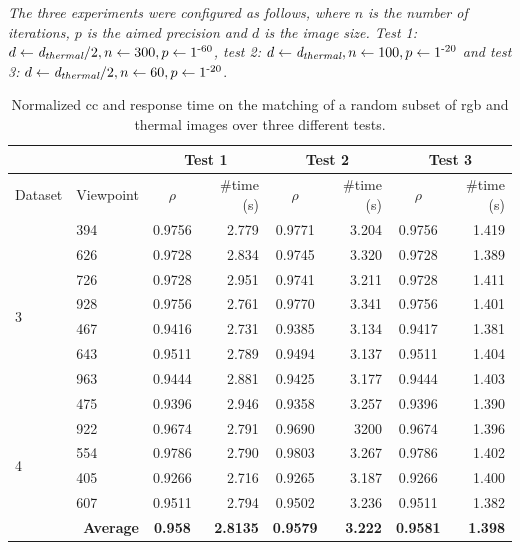 \textit{The three experiments were configured as follows, where $n$ is the number of iterations, $p$ is the aimed precision and $d$ is the image size. Test 1: $d \gets \textit{d}_{\textit{thermal}} / 2, n \gets 300, p \gets 1\textsuperscript{-60}$, test 2: $d \gets \textit{d}_{\textit{thermal}}, n \gets 100, p \gets 1\textsuperscript{-20}$ and test 3: $d \gets \textit{d}_{\textit{thermal}} / 2, n \gets 60, p \gets 1\textsuperscript{-20}$}.

\renewcommand{\arraystretch}{1.1}
\begin{table}[ht]
    \small
    \caption{Normalized \acrshort{cc} and response time on the matching of a random subset of \acrshort{rgb} and thermal images over three different tests.}
    \label{table:thermal_rgb_correlation}
    \begin{tabular}{ll|cr|cr|cr}
        \toprule
        \multicolumn{2}{c}{} & \multicolumn{2}{c}{Test 1} & \multicolumn{2}{c}{Test 2} & \multicolumn{2}{c}{Test 3}\\
        \toprule
        Dataset & Viewpoint & $\rho$ & \#time (\si{\second}) & $\rho$ & \#time (\si{\second}) & $\rho$ & \#time (\si{\second})\\
        \cmidrule{1-8}
        \multirow{8}{*}{3} & 394 & 0.9756 & 2.779 & 0.9771 & 3.204 & 0.9756 & 1.419\\
        & 626 & 0.9728 & 2.834 & 0.9745 & 3.320 & 0.9728 & 1.389\\
        & 726 & 0.9728 & 2.951 & 0.9741 & 3.211 & 0.9728 & 1.411\\ 
        & 928 & 0.9756 & 2.761 & 0.9770 & 3.341 & 0.9756 & 1.401\\
        & 467 & 0.9416 & 2.731 & 0.9385 & 3.134 & 0.9417 & 1.381\\
        & 643 & 0.9511 & 2.789 & 0.9494 & 3.137 & 0.9511 & 1.404\\ 
        & 963 & 0.9444 & 2.881 & 0.9425 & 3.177 & 0.9444 & 1.403\\
        & 475 & 0.9396 & 2.946 & 0.9358 & 3.257 & 0.9396 & 1.390\\
        \cmidrule{1-8}
        \multirow{4}{*}{4} & 922 & 0.9674 & 2.791 & 0.9690 & 3200 & 0.9674 & 1.396\\
        & 554 & 0.9786 & 2.790 & 0.9803 & 3.267 & 0.9786 & 1.402\\
        & 405 & 0.9266 & 2.716 & 0.9265 & 3.187 & 0.9266 & 1.400\\
        & 607 & 0.9511 & 2.794 & 0.9502 & 3.236 & 0.9511 & 1.382\\
        \cmidrule{1-8}
        \multicolumn{2}{r|}{\textbf{Average}} & \textbf{0.958} & \textbf{2.8135} & \textbf{0.9579} & \textbf{3.222} & \textbf{0.9581} & \textbf{1.398}\\
        \bottomrule
    \end{tabular}
    \normalsize
\end{table}
\renewcommand{\arraystretch}{1}

